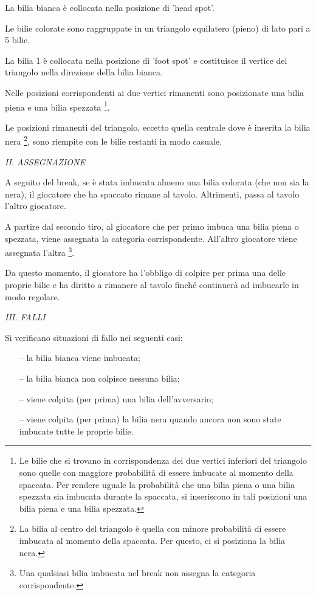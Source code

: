 \documentclass[12pt,a4paper]{report}
\begin{document}
La bilia bianca è collocata nella posizione di 'head spot'.

Le bilie colorate sono raggruppate in un triangolo equilatero (pieno) di lato pari a 5 bilie.

La bilia 1 è collocata nella posizione di 'foot spot' e costituisce il vertice del triangolo nella direzione della bilia bianca.

Nelle posizioni corrispondenti ai due vertici rimanenti sono posizionate una bilia piena e una bilia spezzata \footnote{Le bilie che si trovano in corrispondenza dei due vertici inferiori del triangolo sono quelle con maggiore probabilità di essere imbucate al momento della spaccata. Per rendere uguale la probabilità che una bilia piena o una bilia spezzata sia imbucata durante la spaccata, si inseriscono in tali posizioni una bilia piena e una bilia spezzata.}.

Le posizioni rimanenti del triangolo, eccetto quella centrale dove è inserita la bilia nera \footnote{La bilia al centro del triangolo è quella con minore probabilità di essere imbucata al momento della spaccata. Per questo, ci si posiziona la bilia nera.}, sono riempite con le bilie restanti in modo casuale.

\vspace{9mm}
\noindent \emph{II. ASSEGNAZIONE}

A seguito del break, se è stata imbucata almeno una bilia colorata (che non sia la nera), il giocatore che ha spaccato rimane al tavolo.
Altrimenti, passa al tavolo l'altro giocatore.

A partire dal secondo tiro, al giocatore che per primo imbuca una bilia piena o spezzata, viene assegnata la categoria corrispondente.
All'altro giocatore viene assegnata l'altra \footnote{Una qualsiasi bilia imbucata nel break non assegna la categoria corrispondente.}.

Da questo momento, il giocatore ha l'obbligo di colpire per prima una delle proprie bilie e ha diritto a rimanere al tavolo finché continuerà ad imbucarle in modo regolare.

\vspace{9mm}
\noindent \emph{III. FALLI}

Si verificano situazioni di fallo nei seguenti casi:
\begin{itemize}[noitemsep]
    \item[--]la bilia bianca viene imbucata;
    \item[--] la bilia bianca non colpisce nessuna bilia;
    \item[--] viene colpita (per prima) una bilia dell'avversario;
    \item[--] viene colpita (per prima) la bilia nera quando ancora non sono state imbucate tutte le proprie bilie.
\end{itemize}
\end{document}
